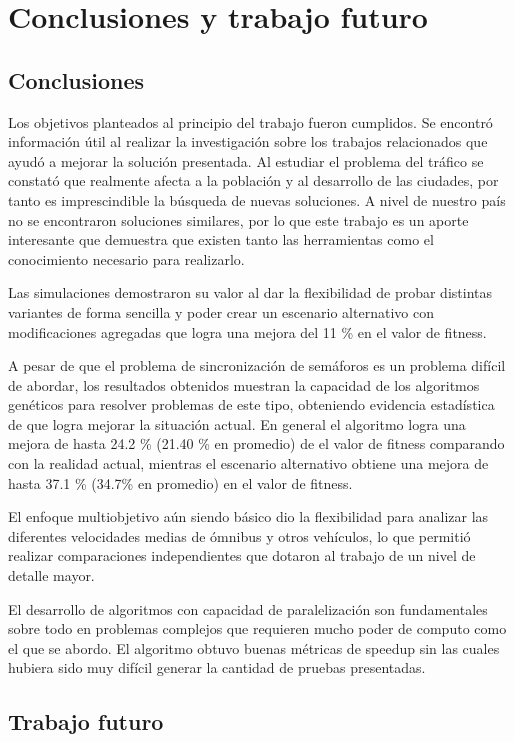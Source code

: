 \chapter{Conclusiones y trabajo futuro}

\section{Conclusiones}
Los objetivos planteados al principio del trabajo fueron cumplidos.
Se encontró información útil al realizar la investigación sobre los trabajos relacionados que ayudó a mejorar la solución presentada. 
Al estudiar el problema del tráfico se constató que realmente afecta a la población y al desarrollo de las ciudades, por tanto es imprescindible la búsqueda de nuevas soluciones. A nivel de nuestro país no se encontraron soluciones similares, por lo que este trabajo es un aporte interesante que demuestra que existen tanto las herramientas como el conocimiento necesario para realizarlo.
 
Las simulaciones demostraron su valor al dar la flexibilidad de probar distintas variantes de forma sencilla y poder crear un escenario alternativo con modificaciones agregadas que logra una mejora del 11 \% en el valor de fitness.
 
A pesar de que el problema de sincronización de semáforos es un problema difícil de abordar, los resultados obtenidos muestran la capacidad de los algoritmos genéticos para resolver problemas de este tipo, obteniendo evidencia estadística de que logra mejorar la situación actual. En general el algoritmo logra una mejora de hasta  24.2 \% (21.40 \% en promedio) de el valor de fitness comparando con la realidad actual, mientras el escenario alternativo obtiene una mejora de hasta 37.1 \% (34.7\% en promedio) en el valor de fitness.

El enfoque multiobjetivo aún siendo básico dio la flexibilidad para analizar las diferentes velocidades medias de ómnibus y otros vehículos, lo que permitió realizar comparaciones independientes que dotaron al trabajo de un nivel de detalle mayor.

El desarrollo de algoritmos con capacidad de paralelización son fundamentales sobre  todo en problemas complejos que requieren mucho poder de computo como el que se abordo. El algoritmo obtuvo buenas métricas de speedup sin las cuales hubiera sido muy difícil generar la cantidad de pruebas presentadas.

\section{Trabajo futuro}

